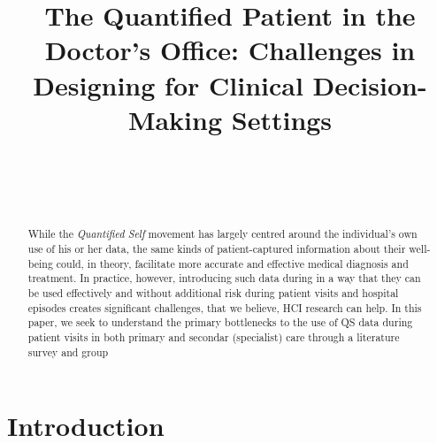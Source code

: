 \documentclass{sigchi}
\begin{document}
\title{The Quantified Patient in the Doctor's Office: Challenges in Designing for Clinical Decision-Making Settings}

\author{%
  \\
  \\
  \\
}

\maketitle

\begin{abstract}
While the \emph{Quantified Self} movement has largely centred around the individual’s own use of his or her data, the same kinds of patient-captured information about their well-being could, in theory, facilitate more accurate and effective medical diagnosis and treatment.  In practice, however, introducing such data during in a way that they can be used effectively and without additional risk during patient visits and hospital episodes creates significant challenges, that we believe, HCI research can help.  In this paper, we seek to understand the primary bottlenecks to the use of QS data during patient visits in both primary and secondar (specialist) care through a literature survey and group 

\end{abstract}


 

\section{Introduction}
\end{document}
